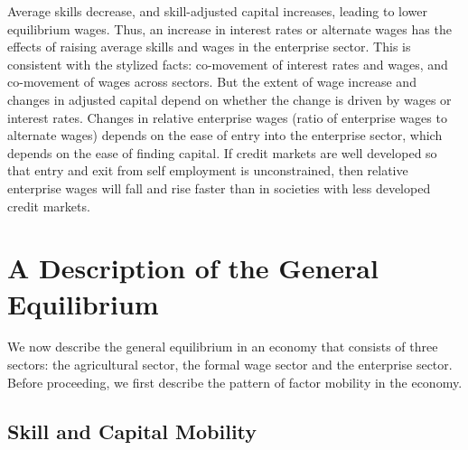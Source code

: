 \documentclass[
  a4paper,
  DIV=11,
  numbers=noendperiod]{scrartcl}
\begin{document}
Average skills decrease, and skill-adjusted capital increases, leading
to lower equilibrium wages. Thus, an increase in interest rates or
alternate wages has the effects of raising average skills and wages in
the enterprise sector. This is consistent with the stylized facts:
co-movement of interest rates and wages, and co-movement of wages across
sectors. But the extent of wage increase and changes in adjusted capital
depend on whether the change is driven by wages or interest rates.
Changes in relative enterprise wages (ratio of enterprise wages to
alternate wages) depends on the ease of entry into the enterprise
sector, which depends on the ease of finding capital. If credit markets
are well developed so that entry and exit from self employment is
unconstrained, then relative enterprise wages will fall and rise faster
than in societies with less developed credit markets.

\hypertarget{a-description-of-the-general-equilibrium}{%
\section{A Description of the General
Equilibrium}\label{a-description-of-the-general-equilibrium}}

We now describe the general equilibrium in an economy that consists of
three sectors: the agricultural sector, the formal wage sector and the
enterprise sector. Before proceeding, we first describe the pattern of
factor mobility in the economy.

\hypertarget{skill-and-capital-mobility}{%
\subsection{Skill and Capital
Mobility}\label{skill-and-capital-mobility}}
\end{document}
